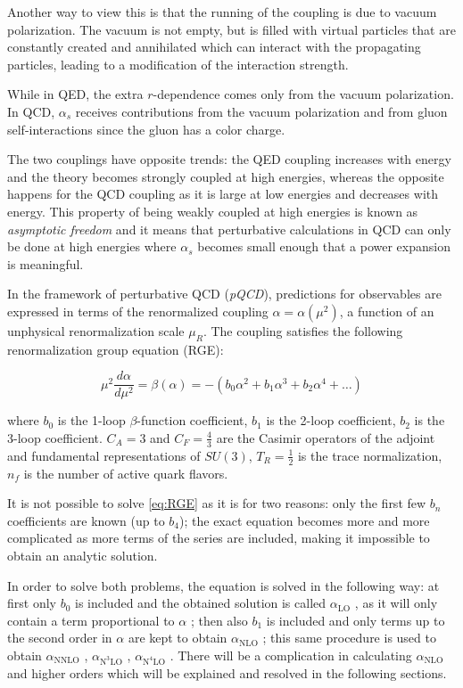 \documentclass[../main.tex]{subfiles}
\begin{document}
Another way to view this is that the running of the coupling is due to vacuum polarization. The vacuum is not empty, but is filled 
with virtual particles that are constantly created and annihilated which can interact with the propagating particles,
leading to a modification of the interaction strength. 

While in QED, the extra $r$-dependence comes only from the vacuum polarization. In QCD, 
$\alpha_s$ receives contributions from the vacuum polarization and from gluon self-interactions since the gluon 
has a color charge.

The two couplings have opposite trends: the QED coupling increases with energy and the theory becomes strongly
coupled at high energies, whereas the opposite happens for the QCD coupling as it is large at low
energies and decreases with energy. This property of being weakly coupled at high energies is
known as \emph{asymptotic freedom} and it means that perturbative calculations in QCD can only be
done at high energies where $\alpha_s$ becomes small enough that a power expansion is meaningful.

In the framework of perturbative QCD (\emph{pQCD}), predictions for observables are expressed in
terms of the renormalized coupling $\alpha = \alpha (\mu^2)$, a function of an unphysical renormalization scale
$\mu_R$. 
The coupling satisfies the following renormalization group equation (RGE):

\begin{equation}\label{eq:RGE}
    \mu^2 \frac{d\alpha}{d\mu^2} = \beta(\alpha) = -\left( b_0 \alpha^2 + b_1 \alpha^3 + b_2 \alpha^4 + \ldots \right)
\end{equation}

where $b_0$ is the 1-loop $\beta$-function coefficient,  
$b_1$ is the 2-loop coefficient, 
$b_2$ is the 3-loop coefficient.
$C_A = 3$ and $C_F = \frac{4}{3}$ are the Casimir operators of the adjoint and fundamental representations of $SU(3)$,
$T_R = \frac{1}{2}$ is the trace normalization, $n_f$ is the number of active quark flavors. 

It is not possible to solve \cref{eq:RGE} as it is for two reasons: only the first few $b_n$ 
coefficients are known (up to $b_4$); the exact equation becomes more and more complicated 
as more terms of the series are included, making it impossible to obtain an analytic solution.

In order to solve both problems, the equation is solved in the following way: at first only $b_0$
is included and the obtained solution is called $\alpha_{\text{LO}}$ , as it will only contain a term proportional to
$\alpha$ ; then also $b_1$ is included and only terms up to the second order in $\alpha$ are kept to obtain $\alpha_{\text{NLO}}$ ;
this same procedure is used to obtain $\alpha_{\text{NNLO}}$ , $\alpha_{\text{N}^3\text{LO}}$ , $\alpha_{\text{N}^4\text{LO}}$ . There will be a complication in
calculating $\alpha_{\text{NLO}}$ and higher orders which will be explained and resolved in the following sections.
\end{document}
